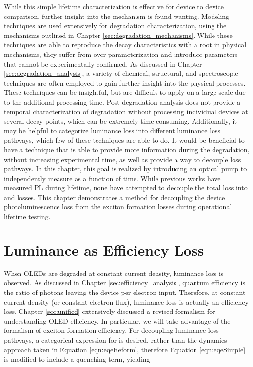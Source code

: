 \documentclass[../thesis.tex]{subfiles}
\begin{document}
While this simple lifetime characterization is effective for device to device comparison, further insight into the mechanism is found wanting.
Modeling techniques are used extensively for degradation characterization, using the mechanisms outlined in Chapter \ref{sec:degradation_mechanisms}.\supercite{Giebink2008a,Ingram2017,Coburn2017}
While these techniques are able to reproduce the decay characteristics with a root in physical mechanisms, they suffer from over-parameterization and introduce parameters that cannot be experimentally confirmed.
As discussed in Chapter \ref{sec:degradation_analysis}, a variety of chemical, structural, and spectroscopic techniques are often employed to gain further insight into the physical processes.\supercite{Seifert2013b,Moraes2011,Scholz2015,Wang2011a,Zhang2016}
These techniques can be insightful, but are difficult to apply on a large scale due to the additional processing time.
Post-degradation analysis does not provide a temporal characterization of degradation without processing individual devices at several decay points, which can be extremely time consuming.
Additionally, it may be helpful to categorize luminance loss into different luminance loss pathways, which few of these techniques are able to do.
It would be beneficial to have a technique that is able to provide more information during the degradation, without increasing experimental time, as well as provide a way to decouple loss pathways.
In this chapter, this goal is realized by introducing an optical pump to independently measure \pl as a function of time.
While previous works have measured PL during lifetime,\supercite{Popovic2001,Kondakov2007d,Winter2008a} none have attempted to decouple the total loss into \pl and \ef losses.
This chapter demonstrates a method for decoupling the device photoluminescence loss from the exciton formation losses during operational lifetime testing.  



\section{Luminance as Efficiency Loss}

When OLEDs are degraded at constant current density, luminance loss is observed.  
As discussed in Chapter \ref{sec:efficiency_analysis}, quantum efficiency is the ratio of photons leaving the device per electron input.
Therefore, at constant current density (or constant electron flux), luminance loss is actually an efficiency loss.
Chapter \ref{sec:unified} extensively discussed a revised formalism for understanding OLED efficiency.
In particular, we will take advantage of the formalism of exciton formation efficiency.  
For decoupling luminance loss pathways, a categorical expression for \eqe is desired, rather than the dynamics approach taken in Equation \ref{eqn:eqeReform}, therefore Equation \ref{eqn:eqeSimple} is modified to include a quenching term, yielding
\end{document}
